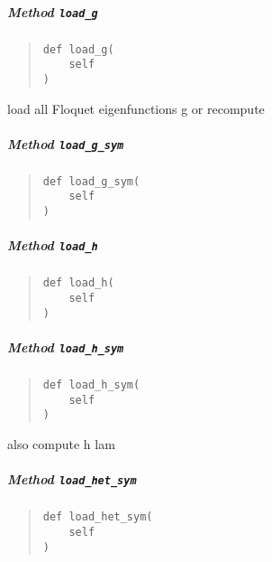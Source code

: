 \documentclass[
  english,
  a4paper,
  oneside]{article}
\begin{document}
\hypertarget{StrongCoupling.StrongCoupling.load_g}{%
\subparagraph{\texorpdfstring{Method
\texttt{load\_g}}{Method load\_g}}\label{StrongCoupling.StrongCoupling.load_g}}

\begin{quote}
\begin{verbatim}
def load_g(
    self
)
\end{verbatim}
\end{quote}

load all Floquet eigenfunctions g or recompute

\hypertarget{StrongCoupling.StrongCoupling.load_g_sym}{%
\subparagraph{\texorpdfstring{Method
\texttt{load\_g\_sym}}{Method load\_g\_sym}}\label{StrongCoupling.StrongCoupling.load_g_sym}}

\begin{quote}
\begin{verbatim}
def load_g_sym(
    self
)
\end{verbatim}
\end{quote}

\hypertarget{StrongCoupling.StrongCoupling.load_h}{%
\subparagraph{\texorpdfstring{Method
\texttt{load\_h}}{Method load\_h}}\label{StrongCoupling.StrongCoupling.load_h}}

\begin{quote}
\begin{verbatim}
def load_h(
    self
)
\end{verbatim}
\end{quote}

\hypertarget{StrongCoupling.StrongCoupling.load_h_sym}{%
\subparagraph{\texorpdfstring{Method
\texttt{load\_h\_sym}}{Method load\_h\_sym}}\label{StrongCoupling.StrongCoupling.load_h_sym}}

\begin{quote}
\begin{verbatim}
def load_h_sym(
    self
)
\end{verbatim}
\end{quote}

also compute h lam

\hypertarget{StrongCoupling.StrongCoupling.load_het_sym}{%
\subparagraph{\texorpdfstring{Method
\texttt{load\_het\_sym}}{Method load\_het\_sym}}\label{StrongCoupling.StrongCoupling.load_het_sym}}

\begin{quote}
\begin{verbatim}
def load_het_sym(
    self
)
\end{verbatim}
\end{quote}
\end{document}
